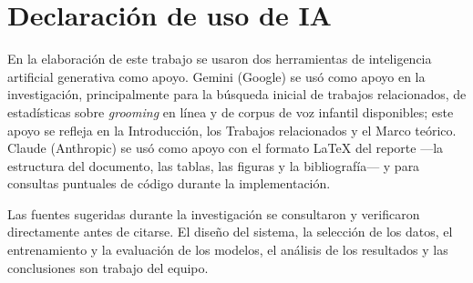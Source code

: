 \documentclass[11pt,a4paper]{article}
\newcommand{\gr}{\emph{grooming}}
\begin{document}
\section{Declaración de uso de IA}

En la elaboración de este trabajo se usaron dos herramientas de inteligencia artificial generativa como apoyo. Gemini (Google) se usó como apoyo en la investigación, principalmente para la búsqueda inicial de trabajos relacionados, de estadísticas sobre \gr{} en línea y de corpus de voz infantil disponibles; este apoyo se refleja en la Introducción, los Trabajos relacionados y el Marco teórico. Claude (Anthropic) se usó como apoyo con el formato \LaTeX{} del reporte ---la estructura del documento, las tablas, las figuras y la bibliografía--- y para consultas puntuales de código durante la implementación.

Las fuentes sugeridas durante la investigación se consultaron y verificaron directamente antes de citarse. El diseño del sistema, la selección de los datos, el entrenamiento y la evaluación de los modelos, el análisis de los resultados y las conclusiones son trabajo del equipo.
\end{document}

